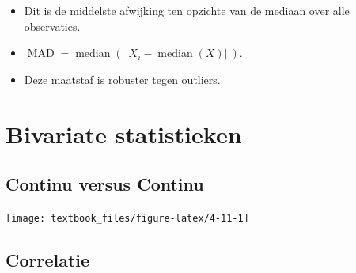\documentclass[]{tufte-book}
\providecommand{\tightlist}{%
  \setlength{\itemsep}{0pt}\setlength{\parskip}{0pt}}
\begin{document}
\begin{itemize}
  \begin{itemize}
  \tightlist
  \item
    Dit is de middelste afwijking ten opzichte van de mediaan over alle observaties.
  \item
    \(\operatorname{MAD} = \operatorname{median}\left(\ \left| X_{i} - \operatorname{median} (X) \right|\ \right)\).
  \item
    Deze maatstaf is robuster tegen outliers.
  \end{itemize}
\end{itemize}

\begin{table}

\caption{\label{tab:4-10}Afstand (spreidingsmaten)}
\centering
{}
\end{table}

\hypertarget{bivariate-statistieken}{%
\section{Bivariate statistieken}\label{bivariate-statistieken}}

\hypertarget{continu-versus-continu}{%
\subsection{Continu versus Continu}\label{continu-versus-continu}}

\texttt{[image: textbook\_files/figure-latex/4-11-1]}

\hypertarget{correlatie}{%
\subsection*{Correlatie}\label{correlatie}}
\end{document}
